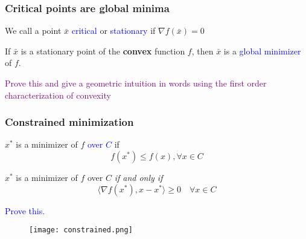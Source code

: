 \documentclass{beamer}
\begin{document}
\begin{frame}
  \frametitle{Critical points are global minima}

  \begin{definition}
    We call a point $\bar{x}$ \textcolor{blue}{critical} or \textcolor{blue}{stationary} if
    $\nabla f(\bar{x}) = 0$
  \end{definition}
  \begin{lemma}%
    If $\bar{x}$ is a stationary point of the \textbf{convex} function $f$, then $\bar{x}$ is a \textcolor{blue}{global minimizer} of $f$.
  \end{lemma}
  \textcolor{purple}{Prove this and give a geometric intuition in words using the first order characterization of convexity}

\end{frame}


\begin{frame}
  \frametitle{Constrained minimization}

  \begin{minipage}{0.5\textwidth}
    \begin{definition}
      $x^*$ is a minimizer of $f$ \textcolor{blue}{over $C$} if
      \begin{equation}
        f(x^*) \le f(x), \forall x \in C
      \end{equation}
    \end{definition}
    \begin{lemma}%
      $x^*$ is a minimizer of $f$ over $C$ \emph{if and only if}
      \begin{equation}
        \langle \nabla f(x^*), x-x^* \rangle \ge 0 \quad \forall x \in C
      \end{equation}
    \end{lemma}
  \textcolor{blue}{Prove this.}
  \end{minipage}
  \hfill
  \begin{minipage}{0.45\textwidth}
  \begin{figure}[ht]
    \centering
    \texttt{[image: constrained.png]}
  \end{figure}
  \end{minipage}

\end{frame}
\end{document}
